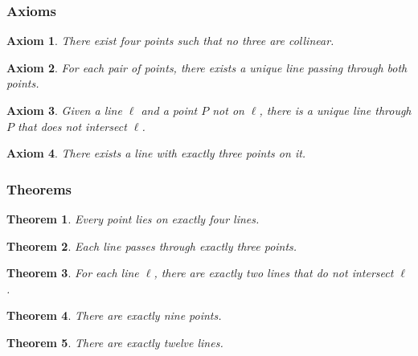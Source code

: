 \documentclass[11pt]{article}
\theoremstyle{definition}
\theoremstyle{plain}
\newtheorem{axiom}{Axiom}[subsection]
\newtheorem{theorem}{Theorem}[subsection]
\begin{document}
\subsubsection*{Axioms}

\begin{axiom}
There exist four points such that no three are collinear.
\end{axiom}

\begin{axiom}
For each pair of points, there exists a unique line passing through both points.
\end{axiom}

\begin{axiom}
Given a line $\ell$ and a point $P$ not on $\ell$, there is a unique line through $P$
that does not intersect $\ell$.
\end{axiom}

\begin{axiom}
There exists a line with exactly three points on it.
\end{axiom}

\subsubsection*{Theorems}

\begin{theorem}
Every point lies on exactly four lines.
\end{theorem}

\begin{theorem}
Each line passes through exactly three points.
\end{theorem}

\begin{theorem}
For each line $\ell$, there are exactly two lines that do not intersect $\ell$.
\end{theorem}

\begin{theorem}
There are exactly nine points.
\end{theorem}

\begin{theorem}
There are exactly twelve lines.
\end{theorem}
\end{document}
